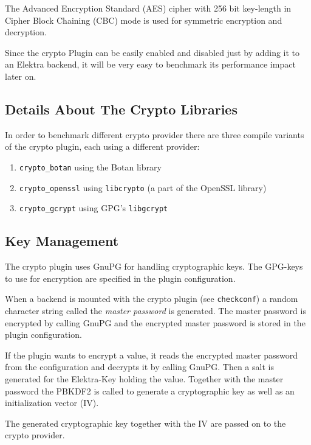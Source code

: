 The Advanced Encryption Standard (AES) cipher with 256 bit key-length in
Cipher Block Chaining (CBC) mode is used for symmetric encryption and
decryption.

Since the crypto Plugin can be easily enabled and disabled just by adding it to an Elektra backend,
it will be very easy to benchmark its performance impact later on.

\subsection{Details About The Crypto
Libraries}\label{details-about-the-crypto-libraries}

In order to benchmark different crypto provider there are three compile
variants of the crypto plugin, each using a different provider:

\begin{enumerate}
\def\labelenumi{\arabic{enumi}.}
\tightlist
\item
  \texttt{crypto\_botan} using the Botan library
\item
  \texttt{crypto\_openssl} using \texttt{libcrypto} (a part of the
  OpenSSL library)
\item
  \texttt{crypto\_gcrypt} using GPG's \texttt{libgcrypt}
\end{enumerate}

\subsection{Key Management}\label{key-management}

The crypto plugin uses GnuPG for handling cryptographic keys. The
GPG-keys to use for encryption are specified in the plugin
configuration.

When a backend is mounted with the crypto plugin (see
\texttt{checkconf}) a random character string called the \emph{master
password} is generated. The master password is encrypted by calling
GnuPG and the encrypted master password is stored in the plugin
configuration.

If the plugin wants to encrypt a value, it reads the encrypted master
password from the configuration and decrypts it by calling GnuPG. Then a
salt is generated for the Elektra-Key holding the value. Together with
the master password the PBKDF2 is called to generate a cryptographic key
as well as an initialization vector (IV).

The generated cryptographic key together with the IV are passed on to
the crypto provider.

